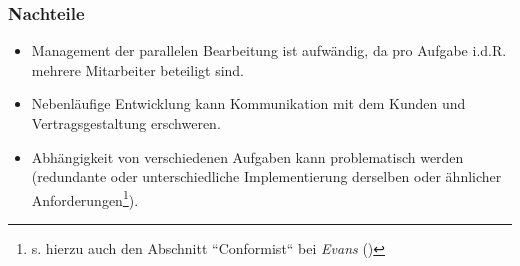 \subsubsection*{Nachteile}

\begin{itemize}
    \item Management der parallelen Bearbeitung ist aufwändig, da pro Aufgabe i.d.R. mehrere Mitarbeiter beteiligt sind.
    \item Nebenläufige Entwicklung kann Kommunikation mit dem Kunden und Vertragsgestaltung erschweren.
    \item Abhängigkeit von verschiedenen Aufgaben kann problematisch werden (redundante oder unterschiedliche Implementierung derselben oder ähnlicher Anforderungen\footnote{
    s. hierzu auch den Abschnitt ``Conformist`` bei \textit{Evans} (\cite[361]{Eva03})
    }).
\end{itemize}
